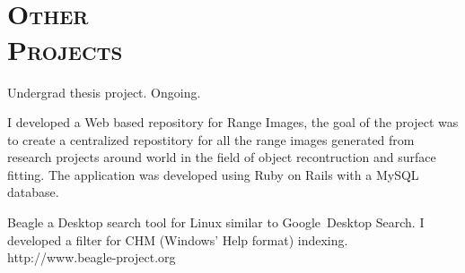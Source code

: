 \begin{resume}
 \begin{formatb}
   \\
   \body\\
 \end{formatb}


\section{\textsc{Other\\  Projects}}

\begin{position}
Undergrad thesis project. Ongoing.
\end{position}

\begin{position}
 I developed a Web based repository for Range Images, the goal of the
 project was to create a centralized repostitory for all the range
 images generated from research projects around world in the field of
 object recontruction and surface fitting. The application was
 developed using Ruby on Rails with a MySQL database.

\end{position}

\begin{position}
Beagle a Desktop search tool  for Linux similar to
Google\texttrademark  \  Desktop
Search. I developed a filter for CHM (Windows' Help format) indexing.
http://www.beagle-project.org
\end{position}







\end{resume}
